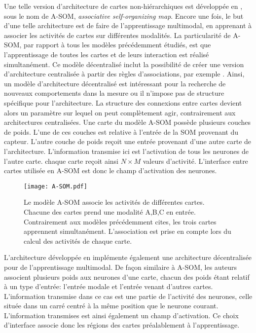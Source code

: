 \documentclass[../main]{subfiles}
\begin{document}
Une telle version d'architecture de cartes non-hiérarchiques est développée en \cite{johnsson_associating_2008,johnsson_associative_2009}, sous le nom de A-SOM, \emph{associative self-organizing map}. Encore une fois, le but d'une telle architecture est de faire de l'apprentissage multimodal, en apprenant à associer les activités de cartes sur différentes modalités. La particularité de A-SOM, par rapport à tous les modèles précédemment étudiés, est que l'apprentissage de toutes les cartes et de leurs interaction est réalisé simultanément. Ce modèle décentralisé inclut la possibilité de créer une version d'architecture centralisée à partir des règles d'associations, par exemple \cite{buonamente_hierarchies_2016}. Ainsi, un modèle d'architecture décentralisé est intéressant pour la recherche de nouveaux comportements dans la mesure ou il n'impose pas de structure spécifique pour l'architecture. La structure des connexions entre cartes devient alors un paramètre sur lequel on peut complètement agir, contrairement aux architectures centralisées.
Une carte du modèle A-SOM possède plusieurs couches de poids. L'une de ces couches est relative à l'entrée de la SOM provenant du capteur. L'autre couche de poids reçoit une entrée provenant d'une autre carte de l'architecture. L'information transmise ici est l'activation de tous les neurones de l'autre carte. chaque carte reçoit ainsi $N\times M$ valeurs d'activité. L'interface entre cartes utilisée en A-SOM est donc le champ d'activation des neurones.

\begin{figure}
    \centering\texttt{[image: A-SOM.pdf]}
    \caption{Le modèle A-SOM \cite{johnsson_associative_2009} associe les activités de différentes cartes. Chacune des cartes prend une modalité A,B,C en entrée. Contrairement aux modèles précédemment cites, les trois cartes apprennent simultanément. L'association est prise en compte lors du calcul des activités de chaque carte.\label{fig:asom}}
\end{figure}

L'architecture développée en \cite{lefort_active_2015} implémente également une architecture décentralisée pour de l'apprentissage multimodal. De façon similaire à A-SOM, les auteurs associent plusieurs poids aux neurones d'une carte, chacun des poids étant relatif à un type d'entrée: l'entrée modale et l'entrée venant d'autres cartes. L'information transmise dans ce cas est une partie de l'activité des neurones, celle située dans un carré centré à la même position que le neurone courant. L'information transmises est ainsi également un champ d'activation. Ce choix d'interface associe donc les régions des cartes préalablement à l'apprentissage.
\end{document}
